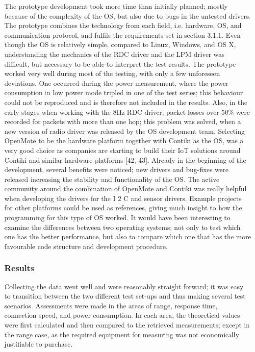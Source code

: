 The prototype development took more time than initially planned;
	mostly because of the complexity of the OS,
	but also due to bugs in the untested drivers.
The prototype combines the technology from each field,
	i.e.
hardware,
	OS,
	and communication protocol,
	and fulfils the requirements set in section 3.1.1.
Even though the OS is relatively simple,
	compared to Linux,
	Windows,
	and OS X,
	understanding the mechanics of the RDC driver and the LPM driver was difficult,
	but necessary to be able to interpret the test results.
The prototype worked very well during most of the testing,
	with only a few unforeseen deviations.
One occurred during the power measurement,
	where the power consumption in low power mode tripled in one of the test series;
	this behaviour could not be reproduced and is therefore not included in the results.
Also,
	in the early stages when working with the 8Hz RDC driver,
	packet losses over 50\% were recorded for packets with more
than one hop;
	this problem was solved,
	when a new version of radio driver was released by the OS development team.
Selecting OpenMote to be the hardware platform together with Contiki as the OS,
	was a very good choice as companies are starting to build their IoT solutions around Contiki and similar hardware platforms [42, 43].
Already in the beginning of the development,
	several benefits were noticed;
	new drivers and bug-fixes were released increasing the stability and functionality of the OS.
The active community around the combination of OpenMote and Contiki was really helpful when developing the drivers for the I 2 C and sensor drivers.
Example projects for other platforms could be used as references,
	giving much insight to how the programming for this type of OS worked.
It would have been interesting to examine the differences between two operating systems;
	not only to test which one has the better performance,
	but also to compare which one that has the more favourable code structure and development procedure.

\subsubsection{Results}
Collecting the data went well and were reasonably straight forward;
	it was easy to transition between the two different test set-ups and thus making several test scenarios.
Assessments were made in the areas of range,
	response time,
	connection speed,
	and power consumption.
In each area,
	the theoretical values were first calculated and then compared to the retrieved measurements;
	except in the range case,
	as the required equipment for measuring was not economically justifiable to purchase.
